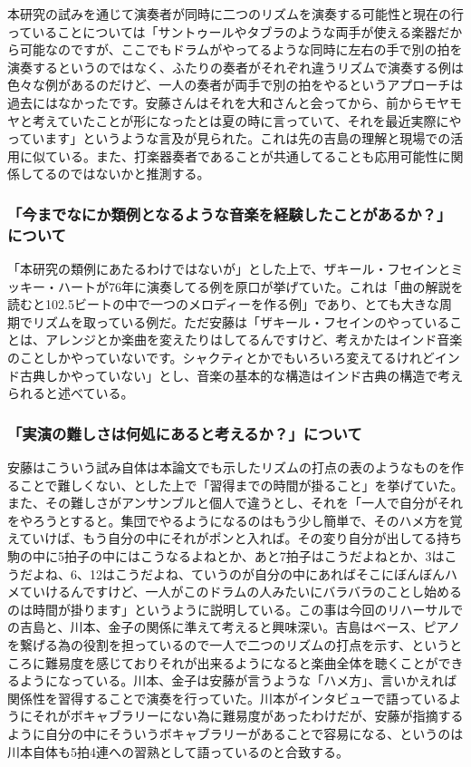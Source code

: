 \documentclass[uplatex,dvipdfmx]{ujarticle}
\begin{document}
本研究の試みを通じて演奏者が同時に二つのリズムを演奏する可能性と現在の行っていることについては「サントゥールやタブラのような両手が使える楽器だから可能なのですが、ここでもドラムがやってるような同時に左右の手で別の拍を演奏するというのではなく、ふたりの奏者がそれぞれ違うリズムで演奏する例は色々な例があるのだけど、一人の奏者が両手で別の拍をやるというアプローチは過去にはなかったです。安藤さんはそれを大和さんと会ってから、前からモヤモヤと考えていたことが形になったとは夏の時に言っていて、それを最近実際にやっています」というような言及が見られた。これは先の吉島の理解と現場での活用に似ている。また、打楽器奏者であることが共通してることも応用可能性に関係してるのではないかと推測する。

\subsubsection{「今までなにか類例となるような音楽を経験したことがあるか？」について}

「本研究の類例にあたるわけではないが」とした上で、ザキール・フセインとミッキー・ハートが76年に演奏してる例を原口が挙げていた。これは「曲の解説を読むと102.5ビートの中で一つのメロディーを作る例」であり、とても大きな周期でリズムを取っている例だ。ただ安藤は「ザキール・フセインのやっていることは、アレンジとか楽曲を変えたりはしてるんですけど、考えかたはインド音楽のことしかやっていないです。シャクティとかでもいろいろ変えてるけれどインド古典しかやっていない」とし、音楽の基本的な構造はインド古典の構造で考えられると述べている。

\subsubsection{「実演の難しさは何処にあると考えるか？」について}

安藤はこういう試み自体は本論文でも示したリズムの打点の表のようなものを作ることで難しくない、とした上で「習得までの時間が掛ること」を挙げていた。また、その難しさがアンサンブルと個人で違うとし、それを「一人で自分がそれをやろうとすると。集団でやるようになるのはもう少し簡単で、そのハメ方を覚えていけば、もう自分の中にそれがポンと入れば。その変り自分が出してる持ち駒の中に5拍子の中にはこうなるよねとか、あと7拍子はこうだよねとか、3はこうだよね、6、12はこうだよね、ていうのが自分の中にあればそこにぼんぼんハメていけるんですけど、一人がこのドラムの人みたいにバラバラのことし始めるのは時間が掛ります」というように説明している。この事は今回のリハーサルでの吉島と、川本、金子の関係に準えて考えると興味深い。吉島はベース、ピアノを繋げる為の役割を担っているので一人で二つのリズムの打点を示す、というところに難易度を感じておりそれが出来るようになると楽曲全体を聴くことができるようになっている。川本、金子は安藤が言うような「ハメ方」、言いかえれば関係性を習得することで演奏を行っていた。川本がインタビューで語っているようにそれがボキャブラリーにない為に難易度があったわけだが、安藤が指摘するように自分の中にそういうボキャブラリーがあることで容易になる、というのは川本自体も5拍4連への習熟として語っているのと合致する。
\end{document}
